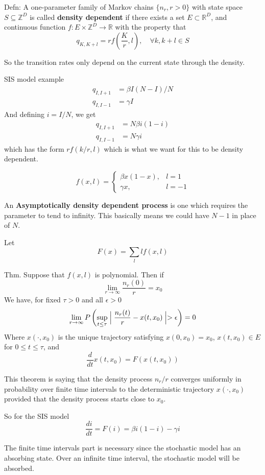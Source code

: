 \documentclass{/home/janmebows/Documents/LatexTemplates/myassignment}
\begin{document}
Defn: A one-parameter family of Markov chains $\{n_r,r >0\}$ with state space $S \subseteq \mathbb{Z}^{D}$ is called \textbf{density dependent} if there exists a set $E \subset \mathbb{R}^D$, and continuous function $f : E\times \mathbb{Z}^D \to \mathbb{R}$ with the property that
\[q_{K,K+l} = r f(\frac{K}{r}, l), \quad \forall k, k+l \in S\]

So the transition rates only depend on the current state through the density. 


SIS model example
\begin{align*}
    q_{I,I+1} &= \beta I(N-I)/N\\
    q_{I,I-1} &= \gamma I
\end{align*}
And defining $i = I/N$, we get
\begin{align*}
    q_{I,I+1} &= N\beta i(1-i)\\
    q_{I,I-1} &= N \gamma i
\end{align*}
which has the form $rf(k/r, l)$ which is what we want for this to be density dependent.

\[f(x,l) = \begin{cases}
\beta x(1-x),& l=1\\
\gamma x,& l=-1
\end{cases}\]


An \textbf{Asymptotically density dependent process} is one which requires the parameter to tend to infinity. This basically means we could have $N-1$ in place of $N$.



Let 
\[F(x) = \sum_l l f(x,l)\]

Thm. Suppose that $f(x,l)$ is polynomial. Then if 
\[\lim_{r\to \infty} \frac{n_r(0)}{r} = x_0\]
We have, for fixed $\tau > 0$ and all $\epsilon >0$
\[\lim_{r\to\infty} P\left(\sup_{t\leq \tau} \Bigm|\frac{n_r(t)}{r} - x(t,x_0)\Bigm| > \epsilon \right) =0\]
Where $x(\cdot,x_0)$ is the unique trajectory satisfying $x(0,x_0) = x_0$, $x(t,x_0) \in E$ for $0\leq t \leq \tau$, and 
\[\frac{d}{dt} x(t,x_0) = F(x(t,x_0))\]

This theorem is saying that the density process $n_r/r$ converges uniformly in probability over finite time intervals to the deterministic trajectory $x(\cdot,x_0)$ provided that the density process starts close to $x_0$.


So for the SIS model
\[\frac{di}{dt} = F(i) = \beta i(1-i) - \gamma i\]

The finite time intervals part is necessary since the stochastic model has an absorbing state. Over an infinite time interval, the stochastic model will be absorbed.
\end{document}
